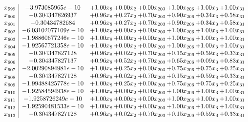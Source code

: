 \documentclass[8pt]{article}
\begin{document}
\[\begin{array}{c| c c@{\hskip 2pt} c@{\hskip 2pt} c@{\hskip 2pt} c@{\hskip 2pt} c@{\hskip 2pt} c@{\hskip 2pt} }
 x_{599}   &  -3.973085965e-10 & +  1.00 x_{8} & +  0.00 x_{2} & +  0.00 x_{203} & +  1.00 x_{206} & +  1.00 x_{3} & +  1.00 x_{31}\\
 x_{600}   &  -0.304347826937 & +  0.96 x_{8} & +  0.27 x_{2} & +  0.70 x_{203} & +  0.90 x_{206} & +  0.34 x_{3} & +  0.58 x_{31}\\
 x_{601}   &  -0.30434782684 & +  0.96 x_{8} & +  0.27 x_{2} & +  0.70 x_{203} & +  0.90 x_{206} & +  0.34 x_{3} & +  0.58 x_{31}\\
 x_{602}   &  -6.03102077109e-10 & +  1.00 x_{8} & +  0.00 x_{2} & +  0.00 x_{203} & +  1.00 x_{206} & +  1.00 x_{3} & +  1.00 x_{31}\\
 x_{603}   &  -1.98860677246e-10 & +  1.00 x_{8} & +  0.00 x_{2} & +  0.00 x_{203} & +  1.00 x_{206} & +  1.00 x_{3} & +  1.00 x_{31}\\
 x_{604}   &  -1.92567721358e-10 & +  1.00 x_{8} & +  0.00 x_{2} & +  0.00 x_{203} & +  1.00 x_{206} & +  1.00 x_{3} & +  1.00 x_{31}\\
 x_{605}   &  -0.304347827128 & +  0.96 x_{8} & +  0.02 x_{2} & +  0.70 x_{203} & +  0.15 x_{206} & +  0.59 x_{3} & +  0.33 x_{31}\\
 x_{606}   &  -0.304347827137 & +  0.96 x_{8} & +  0.52 x_{2} & +  0.70 x_{203} & +  0.65 x_{206} & +  0.09 x_{3} & +  0.83 x_{31}\\
 x_{607}   &  -2.00290894981e-10 & +  1.00 x_{8} & +  0.25 x_{2} & +  0.00 x_{203} & +  0.75 x_{206} & +  0.75 x_{3} & +  0.25 x_{31}\\
 x_{608}   &  -0.304347827128 & +  0.96 x_{8} & +  0.02 x_{2} & +  0.70 x_{203} & +  0.15 x_{206} & +  0.59 x_{3} & +  0.33 x_{31}\\
 x_{609}   &  -1.99488425778e-10 & +  1.00 x_{8} & +  0.25 x_{2} & +  0.00 x_{203} & +  0.75 x_{206} & +  0.75 x_{3} & +  0.25 x_{31}\\
 x_{610}   &  -1.92584594938e-10 & +  1.00 x_{8} & +  0.00 x_{2} & +  0.00 x_{203} & +  1.00 x_{206} & +  1.00 x_{3} & +  1.00 x_{31}\\
 x_{611}   &  -1.9258726249e-10 & +  1.00 x_{8} & +  0.00 x_{2} & +  0.00 x_{203} & +  1.00 x_{206} & +  1.00 x_{3} & +  1.00 x_{31}\\
 x_{612}   &  -1.92590481533e-10 & +  1.00 x_{8} & +  0.00 x_{2} & +  0.00 x_{203} & +  1.00 x_{206} & +  1.00 x_{3} & +  1.00 x_{31}\\
 x_{613}   &  -0.304347827128 & +  0.96 x_{8} & +  0.02 x_{2} & +  0.70 x_{203} & +  0.15 x_{206} & +  0.59 x_{3} & +  0.33 x_{31}\\

\end{array}\]
\end{document}
